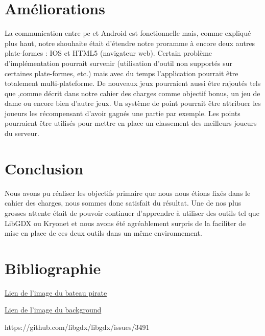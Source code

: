\documentclass{report}
\begin{document}
\chapter{Améliorations}
La communication entre pc et Android est fonctionnelle mais, comme expliqué plus haut, notre shouhaite était d'étendre notre proramme à encore deux autres
plate-formes : IOS et HTML5 (navigateur web). Certain problème d'implémentation pourrait survenir (utilisation d'outil non supportés sur certaines plate-formes, etc.)
mais avec du temps l'application pourrait être totalement multi-plateforme.
De nouveaux jeux pourraient aussi être rajoutés tels que ,comme décrit dans notre cahier des charges comme objectif bonus,
un jeu de dame ou encore bien d'autre jeux. Un système de point pourrait être attribuer les joueurs les récompensant d'avoir gagnés une
partie par exemple. Les points pourraient être utilisés pour mettre en place un classement des meilleurs joueurs du serveur.

\chapter{Conclusion}
Nous avons pu réaliser les objectifs primaire que nous nous étions fixés dans le cahier des charges, nous
sommes donc satisfait du résultat. Une de nos plus grosses attente était de pouvoir continuer d'apprendre à
utiliser des outils tel que LibGDX ou Kryonet et nous avons été agréablement surpris de la faciliter de mise
en place de ces deux outils dans un même environnement.

\chapter{Bibliographie}

\href{http://www.flaticon.com/free-icon/pirate-ship_361245#term=pirate%20ship&page=1&position=6}{Lien de l'image du bateau pirate}

\href{https://www.dreamstime.com/stock-illustration-retro-comic-background-old-yellow-green-halftone-gradient-pop-art-style-image81648431}{Lien de l'image du background}


https://github.com/libgdx/libgdx/issues/3491
\end{document}
